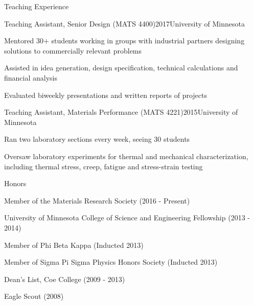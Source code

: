 \documentclass{resume} %
\begin{document}

\begin{rSection}{Teaching Experience}
\begin{rSubsection}{Teaching Assistant, Senior Design (MATS 4400)}{2017}{University of Minnesota}{}
\item Mentored 30+ students working in groups with industrial partners designing solutions to commercially relevant problems
\item Assisted in idea generation, design specification, technical calculations and financial analysis
\item Evaluated biweekly presentations and written reports of projects
\end{rSubsection}

\begin{rSubsection}{Teaching Assistant, Materials Performance (MATS 4221)}{2015}{University of Minnesota}{}
\item Ran two laboratory sections every week, seeing 30 students
\item Oversaw laboratory experiments for thermal and mechanical characterization, including thermal stress, creep, fatigue and stress-strain testing
\end{rSubsection}

\end{rSection}

\begin{rSection}{Honors}

\item Member of the Materials Research Society (2016 - Present)
\item University of Minnesota College of Science and Engineering Fellowship (2013 - 2014)
\item Member of Phi Beta Kappa (Inducted 2013)
\item Member of Sigma Pi Sigma Physics Honors Society (Inducted 2013)
\item Dean's List, Coe College (2009 - 2013)
\item Eagle Scout (2008)

\end{rSection}
\end{document}
